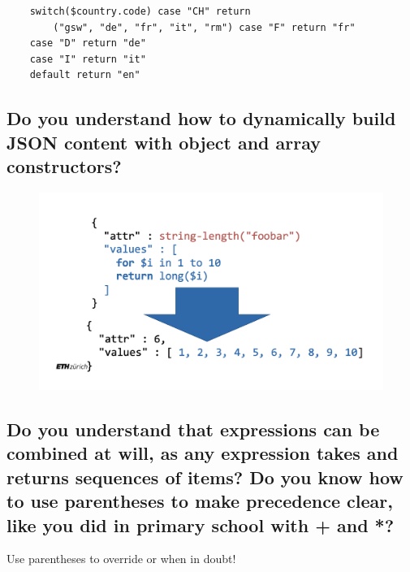 \documentclass{article}
\begin{document}
\begin{verbatim}
    switch($country.code) case "CH" return
        ("gsw", "de", "fr", "it", "rm") case "F" return "fr"
    case "D" return "de"
    case "I" return "it"
    default return "en"
\end{verbatim}

\subsection{Do you understand how to dynamically build JSON content with object and array constructors?}

\begin{figure}[H]
    \centering
    \includegraphics[width=0.5\linewidth]{img/json_construct.png}
\end{figure}

\subsection{Do you understand that expressions can be combined at will, as any expression takes and returns sequences of items? Do you know how to use parentheses to make precedence clear, like you did in primary school with + and *?}

Use parentheses to override or when in doubt!
\end{document}
